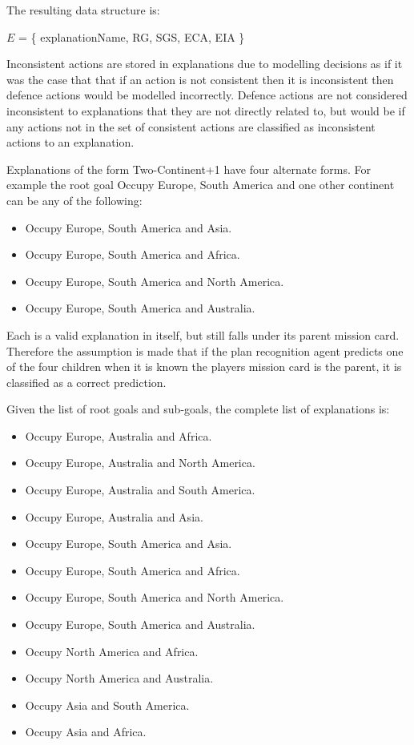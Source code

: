 \documentclass[parskip]{cs4rep}
\begin{document}
The resulting data structure is:\newline

\centerline{
$E$ = \{ explanationName, RG, SGS, ECA, EIA \}
}

Inconsistent actions are stored in explanations due to modelling decisions as if it was the case that that if an action is not consistent then it is inconsistent then defence actions would be modelled incorrectly. Defence actions are not considered inconsistent to explanations that they are not directly related to, but would be if any actions not in the set of consistent actions are classified as inconsistent actions to an explanation.

Explanations of the form Two-Continent+1 have four alternate forms. For example the root goal Occupy Europe, South America and one other continent can be any of the following:

\begin{itemize}
\item
Occupy Europe, South America and Asia.
\item
Occupy Europe, South America and Africa.
\item
Occupy Europe, South America and North America.
\item
Occupy Europe, South America and Australia.
\end{itemize}

Each is a valid explanation in itself, but still falls under its parent mission card. Therefore the assumption is made that if the plan recognition agent predicts one of the four children when it is known the players mission card is the parent, it is classified as a correct prediction.

Given the list of root goals and sub-goals, the complete list of explanations is:

\begin{itemize}
\item
Occupy Europe, Australia and Africa.
\item
Occupy Europe, Australia and North America.
\item
Occupy Europe, Australia and South America.
\item
Occupy Europe, Australia and Asia.
\item
Occupy Europe, South America and Asia.
\item
Occupy Europe, South America and Africa.
\item
Occupy Europe, South America and North America.
\item
Occupy Europe, South America and Australia.
\item
Occupy North America and Africa.
\item
Occupy North America and Australia.
\item
Occupy Asia and South America.
\item
Occupy Asia and Africa.
\end{itemize}
\end{document}
